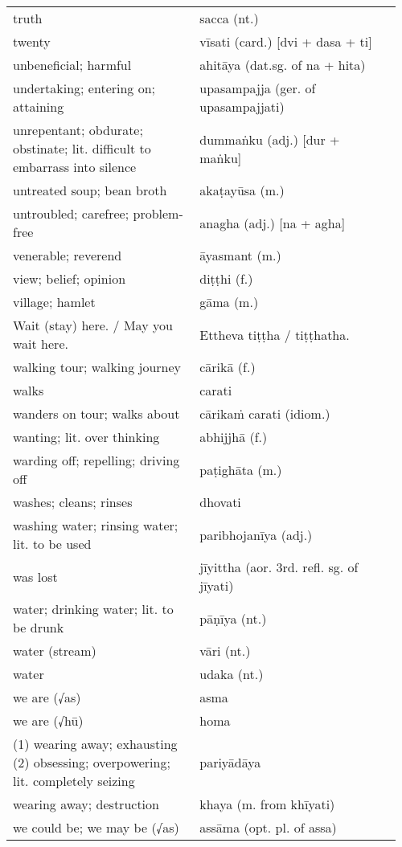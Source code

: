 \documentclass[a5paper]{memoir}
\begin{document}
\begin{longtable}{L{0.48\linewidth} L{0.48\linewidth} H}
truth & sacca (nt.) & \\[0pt]
twenty & vīsati (card.) [dvi + dasa + ti] & \\[0pt]
unbeneficial; harmful & ahitāya (dat.sg. of na + hita) & \\[0pt]
undertaking; entering on; attaining & upasampajja (ger. of upasampajjati) & \\[0pt]
unrepentant; obdurate; obstinate; lit. difficult to embarrass into silence & dummaṅku (adj.) [dur + maṅku] & \\[0pt]
untreated soup; bean broth & akaṭayūsa (m.) & \\[0pt]
untroubled; carefree; problem-free & anagha (adj.) [na + agha] & \\[0pt]
venerable; reverend & āyasmant (m.) & \\[0pt]
view; belief; opinion & diṭṭhi (f.) & \\[0pt]
village; hamlet & gāma (m.) & \\[0pt]
Wait (stay) here. / May you wait here. & Ettheva tiṭṭha / tiṭṭhatha. & \\[0pt]
walking tour; walking journey & cārikā (f.) & \\[0pt]
walks & carati & \\[0pt]
wanders on tour; walks about & cārikaṁ carati (idiom.) & \\[0pt]
wanting; lit. over thinking & abhijjhā (f.) & \\[0pt]
warding off; repelling; driving off & paṭighāta (m.) & \\[0pt]
washes; cleans; rinses & dhovati & \\[0pt]
washing water; rinsing water; lit. to be used & paribhojanīya (adj.) & \\[0pt]
was lost & jīyittha (aor. 3rd. refl. sg. of jīyati) & \\[0pt]
water; drinking water; lit. to be drunk & pāṇīya (nt.) & \\[0pt]
water (stream) & vāri (nt.) & \\[0pt]
water & udaka (nt.) & \\[0pt]
we are (√as) & asma & \\[0pt]
we are (√hū) & homa & \\[0pt]
(1) wearing away; exhausting (2) obsessing; overpowering; lit. completely seizing & pariyādāya & \\[0pt]
wearing away; destruction & khaya (m. from khīyati) & \\[0pt]
we could be; we may be (√as) & assāma (opt. pl. of assa) & \\[0pt]

\end{longtable}
\end{document}
